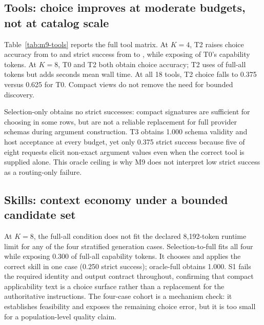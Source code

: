 \subsection{Tools: choice improves at moderate budgets, not at catalog scale}

Table~\ref{tab:m9-tools} reports the full tool matrix. At $K=4$, T2 raises
choice accuracy from \PaperSixFiveMNineToolKFourFullChoice{} to
\PaperSixFiveMNineToolKFourProgressiveChoice{} and strict success from
\PaperSixFiveMNineToolKFourFullSuccess{} to
\PaperSixFiveMNineToolKFourProgressiveSuccess{}, while exposing
\PaperSixFiveMNineToolKFourDisclosure{} of T0's capability tokens. At $K=8$,
T0 and T2 both obtain \PaperSixFiveMNineToolKEightProgressiveChoice{} choice
accuracy; T2 uses \PaperSixFiveMNineToolKEightDisclosure{} of full-all tokens
but adds \PaperSixFiveMNineToolKEightWallOverhead{} seconds mean wall time.
At all 18 tools, T2 choice falls to 0.375 versus 0.625 for T0. Compact views do
not remove the need for bounded discovery.

\begin{table}[!t]
\centering
\scriptsize
\resizebox{\linewidth}{!}{}
\caption{Tool progressive-disclosure matrix. $n$ is the number of context-fitting
generation cases. ``Valid/follow'' is schema-valid call rate. Strict success
also requires the exact benchmark arguments and accepted host execution.}
\label{tab:m9-tools}
\end{table}

Selection-only obtains no strict successes: compact signatures are sufficient
for choosing in some rows, but are not a reliable replacement for full provider
schemas during argument construction. T3 obtains 1.000 schema validity and host
acceptance at every budget, yet only 0.375 strict success because five of eight
requests elicit non-exact argument values even when the correct tool is supplied
alone. This oracle ceiling is why M9 does not interpret low strict success as a
routing-only failure.

\subsection{Skills: context economy under a bounded candidate set}

At $K=8$, the full-all condition does not fit the declared 8,192-token runtime
limit for any of the four stratified generation cases. Selection-to-full fits
all four while exposing 0.300 of full-all capability tokens. It chooses and
applies the correct skill in one case (0.250 strict success); oracle-full
obtains 1.000. S1 fails the required identity and output contract throughout,
confirming that compact applicability text is a choice surface rather than a
replacement for the authoritative instructions. The four-case cohort is a
mechanism check: it establishes feasibility and exposes the remaining choice
error, but it is too small for a population-level quality claim.

